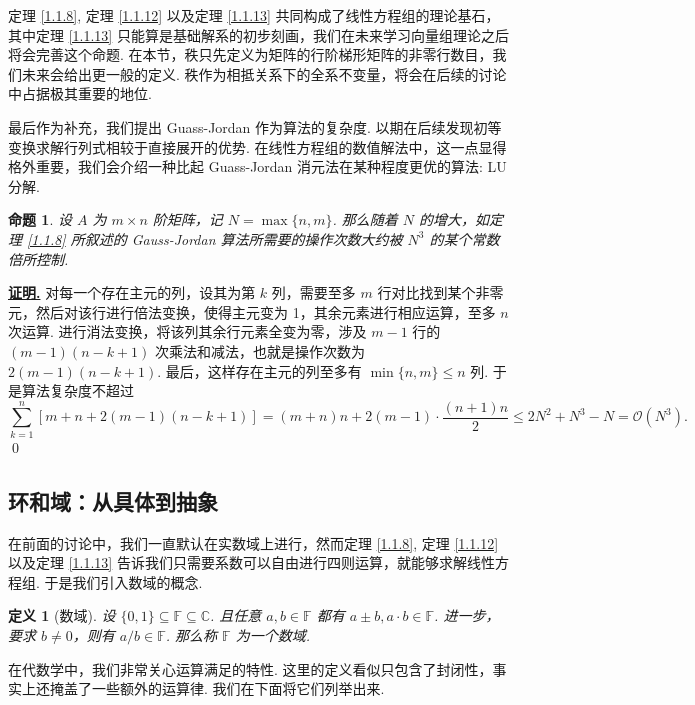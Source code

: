 \documentclass[10pt,openany]{article}
\theoremstyle{thmstyle} %
\theoremstyle{defstyle} %
\newtheorem{definition}[theorem]{定义}
\theoremstyle{prostyle} %
\newtheorem{proposition}[theorem]{命题}
\theoremstyle{exastyle}
\theoremstyle{remstyle}
\renewenvironment{proof}[1][证明]{\par\underline{\textbf{#1.}} \;\fangsong}{\qed\par}
\newcommand{\F}{\mathbb{F}}
\begin{document}
定理 \ref{1.1.8}, 定理 \ref{1.1.12} 以及定理 \ref{1.1.13} 共同构成了线性方程组的理论基石，其中定理 \ref{1.1.13} 只能算是基础解系的初步刻画，我们在未来学习向量组理论之后将会完善这个命题. 在本节，秩只先定义为矩阵的行阶梯形矩阵的非零行数目，我们未来会给出更一般的定义. 秩作为相抵关系下的全系不变量，将会在后续的讨论中占据极其重要的地位.
 
最后作为补充，我们提出 Guass-Jordan 作为算法的复杂度. 以期在后续发现初等变换求解行列式相较于直接展开的优势. 在线性方程组的数值解法中，这一点显得格外重要，我们会介绍一种比起  Guass-Jordan 消元法在某种程度更优的算法: LU 分解.

\begin{proposition}
	设 \( A \) 为 \( m \times n \) 阶矩阵，记 \( N=\max\{n,m\} \). 那么随着 \( N \) 的增大，如定理 \ref{1.1.8} 所叙述的 Gauss-Jordan 算法所需要的操作次数大约被 \( N^3 \) 的某个常数倍所控制. 
\end{proposition}

\begin{proof}
	对每一个存在主元的列，设其为第 \( k \) 列，需要至多 \( m \) 行对比找到某个非零元，然后对该行进行倍法变换，使得主元变为 1，其余元素进行相应运算，至多 \( n \) 次运算. 进行消法变换，将该列其余行元素全变为零，涉及 \( m-1 \) 行的 \( (m-1)(n-k+1) \) 次乘法和减法，也就是操作次数为 \( 2(m-1)(n-k+1) \). 最后，这样存在主元的列至多有 \( \min\{n,m\}\leq n \) 列. 于是算法复杂度不超过
	\[  \sum_{k=1}^{n} [m+n+2(m-1)(n-k+1)]=(m+n)n+2(m-1) \cdot \frac{(n+1)n}{2} \leq 2N^2+N^3-N= \mathcal{O}(N^3). \] 
\end{proof}

\subsection{环和域：从具体到抽象}

在前面的讨论中，我们一直默认在实数域上进行，然而定理 \ref{1.1.8}, 定理 \ref{1.1.12} 以及定理 \ref{1.1.13} 告诉我们只需要系数可以自由进行四则运算，就能够求解线性方程组. 于是我们引入数域的概念.

\begin{definition}[数域]	\label{1.2.1}
	设 \( \{0,1\} \subseteq \F \subseteq \mathbb{C} \). 且任意 \( a,b \in \F \) 都有 \( a \pm b, a \cdot b \in \F \). 进一步，要求 \( b \neq 0 \)，则有 \( a/b \in \F \). 那么称 \( \F \) 为一个数域.

\end{definition}

在代数学中，我们非常关心运算满足的特性. 这里的定义看似只包含了封闭性，事实上还掩盖了一些额外的运算律. 我们在下面将它们列举出来.
\end{document}
